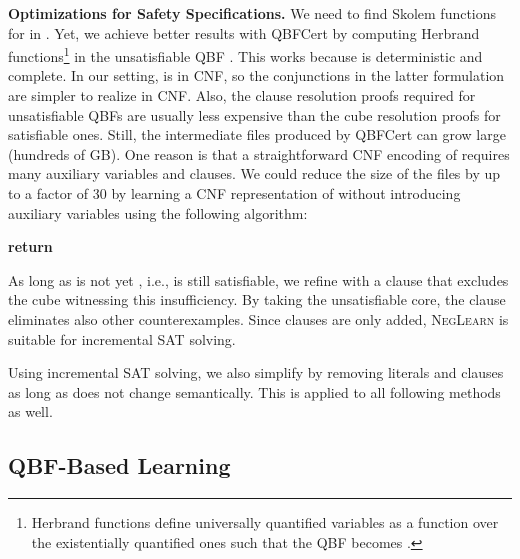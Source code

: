 \documentclass[conference]{IEEEtran}
\newcommand{\qbfcert}{\textsf{QBFCert}\xspace}
\begin{document}
\textbf{Optimizations for Safety Specifications.}   We need to find Skolem 
functions for  in
.
Yet, we achieve better results with \qbfcert by computing Herbrand 
functions\footnote{Herbrand functions define universally quantified variables as 
a function over the existentially quantified ones such that the QBF becomes 
.} in the unsatisfiable QBF 
.
This works because  is deterministic and complete. In our setting,  is in 
CNF, so the conjunctions in the latter formulation are simpler to realize in 
CNF. Also, the clause resolution proofs required for unsatisfiable QBFs are 
usually less expensive than the cube resolution proofs for satisfiable ones. 
Still, the intermediate files produced by \qbfcert can grow large (hundreds of 
GB). One reason is that a straightforward CNF encoding of  requires 
many auxiliary variables and clauses.  We could reduce the size of the files by 
up to a factor of 30 by learning a CNF representation of  without 
introducing auxiliary variables using the following algorithm:
\begin{algorithmic}[1]
             {}
             {}
  \State 
    \State 
  \EndWhile
  \State \textbf{return} 
\EndProcedure
\end{algorithmic}
As long as  is not yet , i.e.,  is still satisfiable, 
we refine  with a clause that excludes the cube  witnessing this 
insufficiency.  By taking the unsatisfiable core, the clause eliminates also 
other counterexamples.  Since clauses are only added, \textsc{NegLearn} is 
suitable for incremental SAT solving.

Using incremental SAT solving, we also simplify  by removing literals and 
clauses as long as  does not change semantically. This is applied to all 
following methods as well.

\subsection{QBF-Based Learning} \label{sec:qbflearn}
\end{document}
